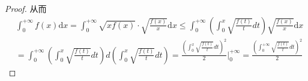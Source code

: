 \documentclass[lang=cn,newtx,10pt,scheme=chinese]{../Template/elegantbook}
\begin{document}
\begin{example}
\begin{proof}
从而
\begin{equation}
\begin{split}
&\int_0^{+\infty}{f\left( x \right) \mathrm{d}x=}\int_0^{+\infty}{\sqrt{xf\left( x \right)}\cdot \sqrt{\frac{f\left( x \right)}{x}}\mathrm{d}x}\leqslant \int_0^{+\infty}{\left( \int_0^x{\sqrt{\frac{f\left( t \right)}{t}}dt} \right) \sqrt{\frac{f\left( x \right)}{x}}\mathrm{d}x}
\\
&=\int_0^{+\infty}{\left( \int_0^x{\sqrt{\frac{f\left( t \right)}{t}}dt} \right) d\left( \int_0^x{\sqrt{\frac{f\left( t \right)}{t}}dt} \right)}=\frac{\left( \int_0^x{\sqrt{\frac{f\left( t \right)}{t}}dt} \right) ^2}{2}\Bigg|_{0}^{+\infty}=\frac{\left( \int_0^{+\infty}{\sqrt{\frac{f\left( t \right)}{t}}dt} \right) ^2}{2}
\end{split}
\nonumber
\end{equation}
\end{proof}
\end{example}
\end{document}
